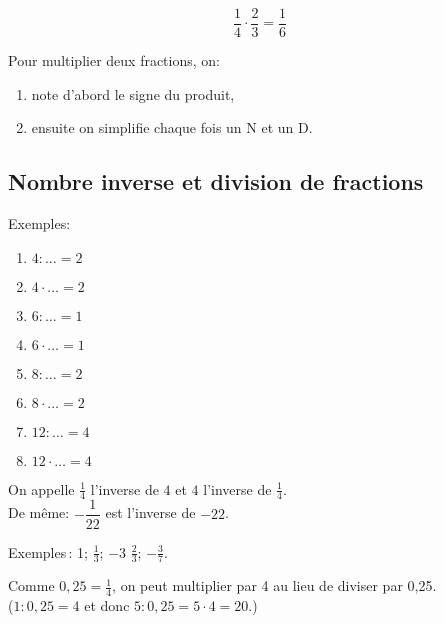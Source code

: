 $$  \dfrac{1}{4} \cdot \dfrac{2}{3} = \dfrac{1}{6} $$



Pour multiplier deux fractions, on:
\begin{enumerate}
	\item note d'abord le signe du produit,
	\item ensuite on simplifie chaque fois un N et un D.
\end{enumerate}

\subsection{Nombre inverse et division de fractions}

Exemples:
\begin{multicols}{4}
\begin{enumerate}[label=\alph*)]
  \item $ 4 : \ldots = 2$
  \item $ 4 \cdot \ldots = 2 $
  \item $ 6 : \ldots = 1 $
  \item $ 6 \cdot \ldots = 1 $
  \item $ 8 : \ldots = 2 $
  \item $ 8 \cdot \ldots = 2 $
  \item $ 12 : \ldots = 4 $
  \item $ 12 \cdot \ldots = 4 $
\end{enumerate}
\end{multicols}


On appelle $\frac{1}{4}$ l'inverse de $4$ et $4$ l'inverse de $\frac{1}{4}$. \\
De même: $-\dfrac{1}{22}$ est l'inverse de $-22$.


Exemples\,: 1; $\frac{1}{3}$; $-3$ $\frac{2}{3}$; $-\frac{3}{7}$.



Comme $0,25 = \frac{1}{4}$, on peut multiplier par 4 au lieu de diviser par 0,25. \\
($1:0,25 =4$ et donc $5:0,25 = 5  \cdot 4 = 20$.)

